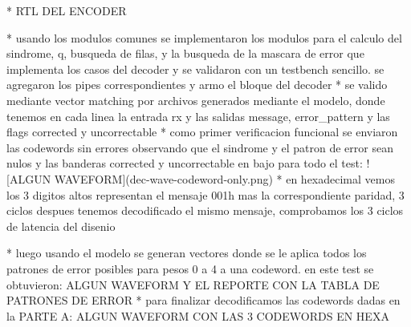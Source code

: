 * RTL DEL ENCODER

* usando los modulos comunes se implementaron los modulos para el calculo del sindrome, q, busqueda de filas, y la busqueda de la mascara de error que implementa los casos del decoder y se validaron con un testbench sencillo. se agregaron los pipes correspondientes y armo el bloque del decoder
* se valido mediante vector matching por archivos generados mediante el modelo, donde tenemos en cada linea la entrada rx y las salidas message, error_pattern y las flags corrected y uncorrectable
* como primer verificacion funcional se enviaron las codewords sin errores observando que el sindrome y el patron de error sean nulos y las banderas corrected y uncorrectable en bajo para todo el test:
![ALGUN WAVEFORM](dec-wave-codeword-only.png)
* en hexadecimal vemos los 3 digitos altos representan el mensaje 001h mas la correspondiente paridad, 3 ciclos despues tenemos decodificado el mismo mensaje, comprobamos los 3 ciclos de latencia del disenio

* luego usando el modelo se generan vectores donde se le aplica todos los patrones de error posibles para pesos 0 a 4 a una codeword. en este test se obtuvieron:
ALGUN WAVEFORM Y EL REPORTE CON LA TABLA DE PATRONES DE ERROR
* para finalizar decodificamos las codewords dadas en la PARTE A:
ALGUN WAVEFORM CON LAS 3 CODEWORDS EN HEXA

